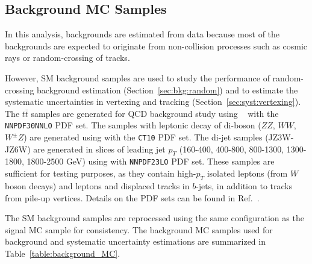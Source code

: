 \subsection{Background MC Samples}
\label{sec:background_mc_sample}
In this analysis, backgrounds are estimated from data because most of the backgrounds are expected to originate from non-collision processes such as cosmic rays or random-crossing of tracks. %

However, SM background samples are used to study the performance of random-crossing background estimation (Section~\ref{sec:bkg:random}) and to estimate the systematic uncertainties in vertexing and tracking (Section~\ref{sec:syst:vertexing}). The $t\bar{t}$ samples are generated for QCD background study using ~\cite{Gleisberg:2008ta} with the \texttt{NNPDF30NNLO} PDF set. The samples with leptonic decay of di-boson ($ZZ$, $WW$, $W^{\pm}Z$) are generated using  with the \texttt{CT10} PDF set. The di-jet samples (JZ3W-JZ6W) are generated in slices of leading jet $p_{T}$ (160-400, 400-800, 800-1300, 1300-1800, 1800-2500 GeV) using  with \texttt{NNPDF23LO} PDF set. These samples are sufficient for testing purposes, as they contain high-$p_{T}$ isolated leptons (from $W$ boson decays) and leptons and displaced tracks in $b$-jets, in addition to tracks from pile-up vertices. Details on the PDF sets can be found in Ref.~\cite{Ball:2014uwa}.

The SM background samples are reprocessed using the same configuration as the signal MC sample for consistency. The background MC samples used for background and systematic uncertainty estimations are summarized in Table~\ref{table:background_MC}.


